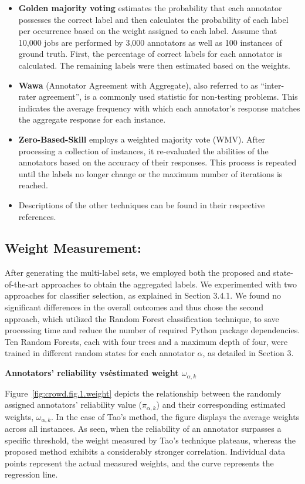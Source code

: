 \begin{itemize}
    \item \textbf{Golden majority voting} estimates the probability that each annotator possesses the correct label and then calculates the probability of each label per occurrence based on the weight assigned to each label. Assume that 10,000 jobs are performed by 3,000 annotators as well as 100 instances of ground truth. First, the percentage of correct labels for each annotator is calculated. The remaining labels were then estimated based on the weights.
    \item \textbf{Wawa} (Annotator Agreement with Aggregate), also referred to as ``inter-rater agreement'', is a commonly used statistic for non-testing problems. This indicates the average frequency with which each annotator's response matches the aggregate response for each instance.
    \item \textbf{Zero-Based-Skill} employs a weighted majority vote (WMV). After processing a collection of instances, it re-evaluated the abilities of the annotators based on the accuracy of their responses. This process is repeated until the labels no longer change or the maximum number of iterations is reached.

    \item Descriptions of the other techniques can be found in their respective references.
\end{itemize}

\subsection{Weight Measurement:}

After generating the multi-label sets, we employed both the proposed and state-of-the-art approaches to obtain the aggregated labels. We experimented with two approaches for classifier selection, as explained in Section 3.4.1. We found no significant differences in the overall outcomes and thus chose the second approach, which utilized the Random Forest classification technique, to save processing time and reduce the number of required Python package dependencies. Ten Random Forests, each with four trees and a maximum depth of four, were trained in different random states for each annotator $\alpha $, as detailed in Section 3.

\textbf{Annotators' reliability vs\. estimated weight $\omega_{\alpha,k}$ }

Figure~\ref{fig:crowd.fig.1.weight} depicts the relationship between the randomly assigned annotators' reliability value ($\pi_{\alpha,k}$) and their corresponding estimated weights, $\omega_{\alpha,k}$. In the case of Tao's method, the figure displays the average weights across all instances. As seen, when the reliability of an annotator surpasses a specific threshold, the weight measured by Tao's technique plateaus, whereas the proposed method exhibits a considerably stronger correlation. Individual data points represent the actual measured weights, and the curve represents the regression line.

